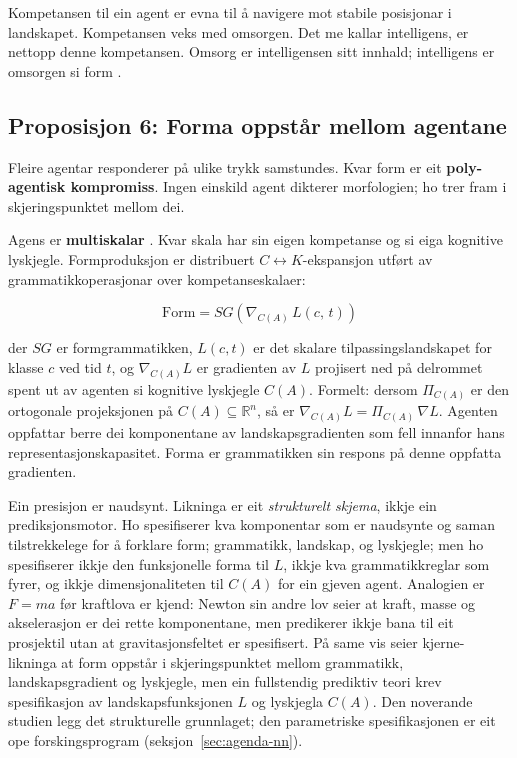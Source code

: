 Kompetansen til ein agent er evna til å navigere mot stabile posisjonar i landskapet. Kompetansen veks med omsorgen. Det me kallar intelligens, er nettopp denne kompetansen. Omsorg er intelligensen sitt innhald; intelligens er omsorgen si form \parencite{Doctor2024}.

\subsection{Proposisjon 6: Forma oppstår mellom agentane}

Fleire agentar responderer på ulike trykk samstundes. Kvar form er eit \textbf{poly-agentisk kompromiss}. Ingen einskild agent dikterer morfologien; ho trer fram i skjeringspunktet mellom dei.

Agens er \textbf{multiskalar} \parencite{Levin2022}. Kvar skala har sin eigen kompetanse og si eiga kognitive lyskjegle. Formproduksjon er distribuert $C \leftrightarrow K$-ekspansjon utført av grammatikkoperasjonar over kompetanseskalaer:

\begin{equation*}
\mathrm{Form} = SG\!\left(\nabla_{C(A)}\, L(c,\, t)\right)
\end{equation*}

\noindent der $SG$ er formgrammatikken, $L(c,t)$ er det skalare tilpassingslandskapet for klasse $c$ ved tid $t$, og $\nabla_{C(A)} L$ er gradienten av $L$ projisert ned på delrommet spent ut av agenten si kognitive lyskjegle $C(A)$. Formelt: dersom $\Pi_{C(A)}$ er den ortogonale projeksjonen på $C(A) \subseteq \mathbb{R}^n$, så er $\nabla_{C(A)} L = \Pi_{C(A)}\, \nabla L$. Agenten oppfattar berre dei komponentane av landskapsgradienten som fell innanfor hans representasjonskapasitet. Forma er grammatikken sin respons på denne oppfatta gradienten.

Ein presisjon er naudsynt. Likninga er eit \textit{strukturelt skjema}, ikkje ein prediksjonsmotor. Ho spesifiserer kva komponentar som er naudsynte og saman tilstrekkelege for å forklare form; grammatikk, landskap, og lyskjegle; men ho spesifiserer ikkje den funksjonelle forma til $L$, ikkje kva grammatikkreglar som fyrer, og ikkje dimensjonaliteten til $C(A)$ for ein gjeven agent. Analogien er $F = ma$ før kraftlova er kjend: Newton sin andre lov seier at kraft, masse og akselerasjon er dei rette komponentane, men predikerer ikkje bana til eit prosjektil utan at gravitasjonsfeltet er spesifisert. På same vis seier kjerne-likninga at form oppstår i skjeringspunktet mellom grammatikk, landskapsgradient og lyskjegle, men ein fullstendig prediktiv teori krev spesifikasjon av landskapsfunksjonen $L$ og lyskjegla $C(A)$. Den noverande studien legg det strukturelle grunnlaget; den parametriske spesifikasjonen er eit ope forskingsprogram (seksjon~\ref{sec:agenda-nn}).

